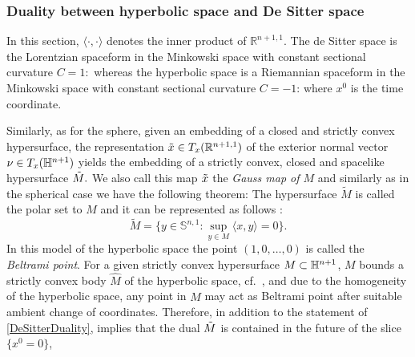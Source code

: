 \subsubsection*{Duality between hyperbolic space and De Sitter space} In this section, $\langle \cdot,\cdot\rangle$ denotes the inner product of $\mathbb{R}^{n+1,1}.$
The de Sitter space is the Lorentzian spaceform in the Minkowski space with constant sectional curvature $C=1:$
whereas the hyperbolic space is a Riemannian spaceform in the Minkowski space with constant sectional curvature $C=-1$:
where $x^0$ is the time coordinate.

Similarly, as for the sphere, given an embedding
of a closed and strictly convex hypersurface, the representation $\~x\in T_x(\R^{n+1,1})$ of the exterior normal vector $\nu\in T_x(\H^{n+1})$ yields the embedding
of a strictly convex, closed and spacelike hypersurface $\~M.$
We also call this map $\~x$ the {\it{Gauss map of $M$}} and similarly as in the spherical case we have the following theorem:
The hypersurface $\tilde{M}$ is called the polar set to $M$ and it can be represented as follows \cite[Thm.~10.4.8]{Gerhardt:/2006}:
$$\tilde{M}=\{y\in \mathbb{S}^{n,1}: \sup_{y\in M}\langle x,y\rangle=0\}.$$
In this model of the hyperbolic space the point $(1,0,\ldots,0)$ is called the {\it{Beltrami point}}. For a given strictly convex hypersurface $M\sub\H^{n+1}$, $M$ bounds a strictly convex body $\hat{M}$ of the hyperbolic space, cf.~\cite[Thm.~10.3.1]{Gerhardt:/2006}, and due to the homogeneity of the hyperbolic space, any point in $\hat{M}$ may act as Beltrami point after suitable ambient change of coordinates. Therefore, in addition to the statement of \cref{DeSitterDuality}, \cite[Thm.~10.4.9.]{Gerhardt:/2006} implies that the dual $\~M$ is contained in the future of the slice $\{x^0=0\}$,
